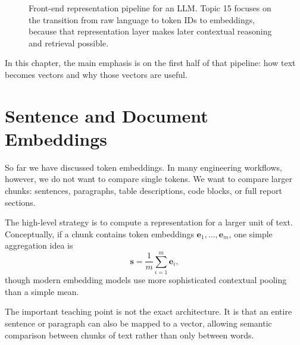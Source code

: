 \documentclass[12pt]{article}
\begin{document}
\begin{figure}[ht]
\centering
{}
\caption{Front-end representation pipeline for an LLM. Topic 15 focuses on the transition from raw language to token IDs to embeddings, because that representation layer makes later contextual reasoning and retrieval possible.}
\label{t15fig:minimal_pipeline}
\end{figure}

In this chapter, the main emphasis is on the first half of that pipeline: how text becomes vectors and why those vectors are useful.

\section{Sentence and Document Embeddings}

So far we have discussed token embeddings. In many engineering workflows, however, we do not want to compare single tokens. We want to compare larger chunks: sentences, paragraphs, table descriptions, code blocks, or full report sections.

The high-level strategy is to compute a representation for a larger unit of text. Conceptually, if a chunk contains token embeddings $\mathbf{e}_1,\dots,\mathbf{e}_m$, one simple aggregation idea is
\begin{equation}
    \mathbf{s} = \frac{1}{m} \sum_{i=1}^m \mathbf{e}_i,
    \label{t15eq:sentence_mean}
\end{equation}
though modern embedding models use more sophisticated contextual pooling than a simple mean.

The important teaching point is not the exact architecture. It is that an entire sentence or paragraph can also be mapped to a vector, allowing semantic comparison between chunks of text rather than only between words.
\end{document}
